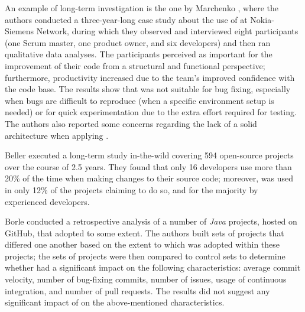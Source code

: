 An example of long-term investigation is the one by Marchenko \etal \cite{DBLP:conf/xpu/MarchenkoAI09}, where the authors conducted a three-year-long case study about the use of \tdd at Nokia-Siemens Network, during which they observed and interviewed eight participants (one Scrum master, one product owner, and six developers) and then ran qualitative data analyses. 
The participants perceived \tdd as important for the improvement of their code from a structural and functional perspective; furthermore, productivity increased due to the team's improved confidence with the code base. The results show that \tdd was not suitable for bug fixing, especially when bugs are difficult to reproduce (\eg when a specific environment setup is needed) or for quick experimentation due to the extra effort required for testing. The authors also reported some concerns regarding the lack of a solid architecture when applying \tdd.

Beller \etal \cite{DBLP:journals/tse/BellerGPPAZ19} executed a long-term study in-the-wild covering 594 open-source projects over the course of 2.5 years. They found that only 16 developers use \tdd more than 20\% of the time when making changes to their source code; moreover, \tdd was used in only 12\% of the projects claiming to do so, and for the majority by experienced developers.

Borle \etal \cite{DBLP:journals/ese/BorleFSGH18} conducted a retrospective analysis of a number of \textit{Java} projects, hosted on GitHub, that adopted \tdd to some extent. The authors built sets of \tdd projects that differed one another based on the extent to which \tdd was adopted within these projects; the sets of \tdd projects were then compared to control sets to determine whether \tdd had a significant impact on the following characteristics: average commit velocity, number of bug-fixing commits, number of issues, usage of continuous integration, and number of pull requests. The results did not suggest any significant impact of \tdd on the above-mentioned characteristics.

